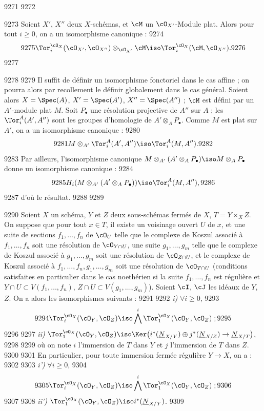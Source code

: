   9271	
  9272	\begin{lemme}[2.4]
  9273	Soient $X'$, $X''$ deux $X$-sch\'emas, et $\cM$ un $\cO_{X'}$-Module plat. Alors pour tout $i \geq 0$, on a un isomorphisme canonique :
  9274	\[
  9275	\Tor_i^{\cO_X}(\cO_{X'}, \cO_{X''}) \otimes_{\cO_{X'}} \cM \iso \Tor_i^{\cO_X}(\cM, \cO_{X''}).
  9276	\]
  9277	\end{lemme}
  9278	
  9279	Il suffit de d\'efinir un isomorphisme fonctoriel dans le cas affine ; on pourra alors par recollement le d\'efinir globalement dans le cas g\'en\'eral. Soient alors $X = \Spec(A)$, $X' = \Spec(A')$, $X'' = \Spec(A'')$ ; $\cM$ est d\'efini par un $A'$-module plat $M$. Soit $P_{\bullet}$ une r\'esolution projective de $A''$ sur $A$ ; les $\Tor_i^A(A', A'')$ sont les groupes d'homologie de $A' \otimes_A P_{\bullet}$. Comme $M$ est plat sur $A'$, on a un isomorphisme canonique :
  9280	\[
  9281	M \otimes_{A'} \Tor_i^A(A', A'') \iso \Tor_i^A(M, A'').
  9282	\]
  9283	Par ailleurs, l'isomorphisme canonique $M \otimes_{A'} (A' \otimes_A P_{\bullet}) \iso M \otimes_A P_{\bullet}$ donne un isomorphisme canonique :
  9284	\[
  9285	H_i(M \otimes_{A'} (A' \otimes_A P_{\bullet})) \iso \Tor_i^A(M, A''),
  9286	\]
  9287	d'o\`u le r\'esultat.
  9288	
  9289	\begin{proposition}[2.5]
  9290	Soient $X$ un sch\'ema, $Y$ et $Z$ deux sous-sch\'emas ferm\'es de $X$, $T = Y \times_X Z$. On suppose que pour tout $x \in T$, il existe un voisinage ouvert $U$ de $x$, et une suite de sections $f_1,\dots,f_n$ de $\cO_U$ telle que le complexe de Koszul associ\'e \`a $f_1,\dots,f_n$ soit une r\'esolution de $\cO_{Y \cap U}$, une suite $g_1,\dots,g_m$ telle que le complexe de Koszul associ\'e \`a $g_1,\dots,g_m$ soit une r\'esolution de $\cO_{Z \cap U}$, et le complexe de Koszul associ\'e \`a $f_1,\dots,f_n,g_1,\dots,g_m$ soit une r\'esolution de $\cO_{T \cap U}$ (conditions satisfaites en particulier dans le cas noeth\'erien si la suite $f_1,\dots,f_n$ est r\'eguli\`ere et $Y \cap U \subset V(f_1,\dots,f_n)$, $Z \cap U \subset V(g_1,\dots,g_m)$). Soient $\cI$, $\cJ$ les id\'eaux de $Y$, $Z$. On a alors les isomorphismes suivants :
  9291	
  9292	\emph{i)} $\forall i \geq 0$,
  9293	\[
  9294	\Tor_i^{\cO_X}(\cO_Y, \cO_Z) \iso \bigwedge^i \Tor_1^{\cO_X}(\cO_Y, \cO_Z) \; ;
  9295	\]
  9296	
  9297	\emph{ii)} $\Tor_1^{\cO_X}(\cO_Y, \cO_Z) \iso \Ker\bigl(i^{*}(\underline{N}_{X/Y}) \oplus j^{*}(\underline{N}_{X/Z}) \to \underline{N}_{X/T}\bigr)$,
  9298	
  9299	o\`u on note $i$ l'immersion de $T$ dans $Y$ et $j$ l'immersion de $T$ dans $Z$.
  9300	
  9301	En particulier, pour toute immersion ferm\'ee r\'eguli\`ere $Y \to X$, on a :
  9302	
  9303	\emph{i')} $\forall i \geq 0$,
  9304	\[
  9305	\Tor_i^{\cO_X}(\cO_Y, \cO_Z) \iso \bigwedge^i \Tor_1^{\cO_X}(\cO_Y, \cO_Z) \; ;
  9306	\]
  9307	
  9308	\emph{ii')} $\Tor_1^{\cO_X}(\cO_Y, \cO_Z) \iso i^{*}(\underline{N}_{X/Y})$.
  9309	\end{proposition}
